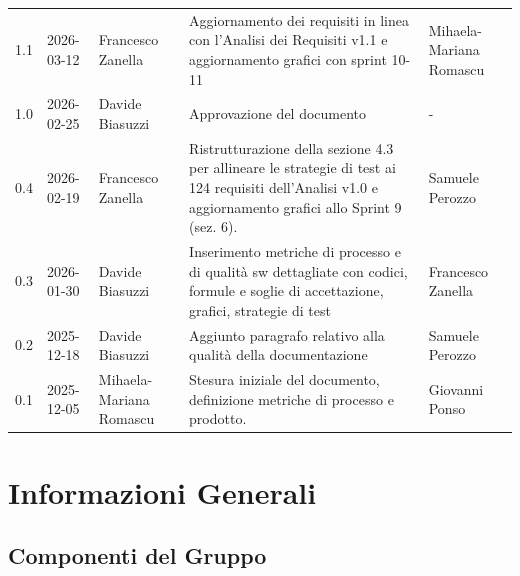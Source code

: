 \documentclass[a4paper,11pt,oneside]{scrartcl}
\begin{document}
{\begin{longtable}{@{}llp{}p{}p{}@{}}
        1.1               & 2026-03-12    & Francesco Zanella       & Aggiornamento dei requisiti in linea con l'Analisi dei Requisiti v1.1 e aggiornamento grafici con sprint 10-11                                           & Mihaela-Mariana Romascu \\
        1.0               & 2026-02-25    & Davide Biasuzzi         & Approvazione del documento                                                                                                                               & -                       \\
        0.4               & 2026-02-19    & Francesco Zanella       & Ristrutturazione della sezione 4.3 per allineare le strategie di test ai 124 requisiti dell'Analisi v1.0 e aggiornamento grafici allo Sprint 9 (sez. 6). & Samuele Perozzo         \\
        0.3               & 2026-01-30    & Davide Biasuzzi         & Inserimento metriche di processo e di qualità sw dettagliate con codici, formule e soglie di accettazione, grafici, strategie di test                    & Francesco Zanella       \\
        0.2               & 2025-12-18    & Davide Biasuzzi         & Aggiunto paragrafo relativo alla qualità della documentazione                                                                                            & Samuele Perozzo         \\
        0.1               & 2025-12-05    & Mihaela-Mariana Romascu & Stesura iniziale del documento, definizione metriche di processo e prodotto.                                                                             & Giovanni Ponso          \\
    \end{longtable}
}

\newpage
\tableofcontents
\newpage

\section*{Informazioni Generali}

\subsection*{Componenti del Gruppo}
\end{document}
